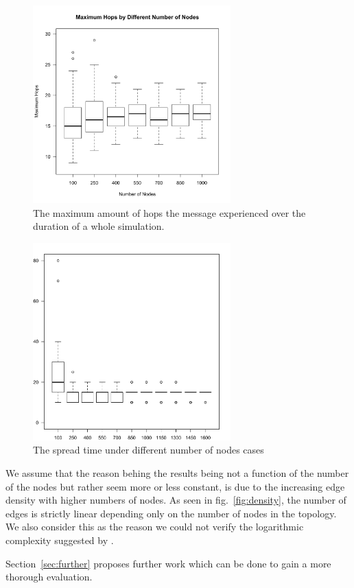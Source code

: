 \documentclass[12pt,journal]{IEEEtran}
\begin{document}
\begin{figure}
	\centering
	\includegraphics[width=3in]{figs/boxplotHopsNodes}
	\caption{The maximum amount of hops the message experienced over the duration of a whole simulation.}
	\label{fig:maxhops}
\end{figure}

\begin{figure}
	\centering
	\includegraphics[width=3in]{figs/Rplot}
	\caption{The spread time under different number of nodes cases}
	\label{fig:bpTimeNodes}
\end{figure}

We assume that the reason behing the results being not a function of the number of the nodes but rather seem more or less constant, is due to the increasing edge density with higher numbers of nodes. As seen in fig.~\ref{fig:density}, the number of edges is strictly linear depending only on the number of nodes in the topology. We also consider this as the reason we could not verify the logarithmic complexity suggested by \cite{gossip}.

Section~\ref{sec:further} proposes further work which can be done to gain a more thorough evaluation.
\end{document}

